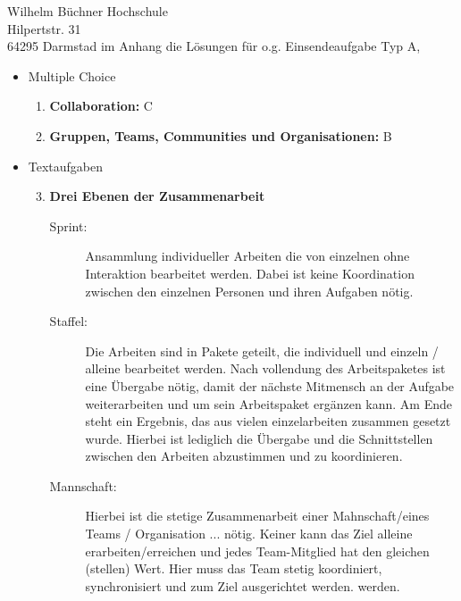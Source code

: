\documentclass[
    version=last,           %
    DIV=13,                 %
    BCOR=0mm,               %
    paper=a4,               %
    fontsize=12pt,          %
    firsthead=on,           %
    firstfoot=on,           %
    pagenumber=on,i         %
    parskip=half,           %
    enlargefirstpage=,      %
    firsthead=on,           %
    fromrule=afteraddress,  %
    priority=off,           %
    backaddress=true,       %
    refline=dateright,      %
	fromalign=right,	    %
    fromemail=on,i          %
    fromurl=on,             %
    frombank=on,
    fromphone=on,           %
    frommobilephone=on      %
    fromlogo=on,            %
    addrfield=on,           %
    subject=untitled,  %
    foldmarks=off,          %
    numericaldate=off,      %
	pagenumber=right,	        %
	parskip=half,	        %
    headsep=false,          %
    footsepline=true,       %
    foldmarks=off,		    %
	]{scrlttr2}
\begin{document}
\begin{letter} {Wilhelm Büchner Hochschule \\
Hilpertstr. 31\\
64295 Darmstad}
im Anhang die Lösungen für o.g. Einsendeaufgabe Typ A,
\\
\begin{itemize}
    \item Multiple Choice
        \begin{enumerate}
        \item \textbf{Collaboration:} C
        \item \textbf{Gruppen, Teams, Communities und Organisationen:} B
        \end{enumerate}
            \vspace{1cm}
    \item Textaufgaben
        \begin{enumerate}
        \setcounter{enumi}{2}
    \item \textbf{Drei Ebenen der Zusammenarbeit}
        \begin{description}
    \item[Sprint:]  Ansammlung individueller Arbeiten die von einzelnen ohne
        Interaktion bearbeitet werden. Dabei ist keine Koordination zwischen den
        einzelnen Personen und ihren Aufgaben nötig.
    \item[Staffel:] Die Arbeiten sind in Pakete geteilt, die individuell und
        einzeln / alleine bearbeitet werden. Nach vollendung des Arbeitspaketes
        ist eine Übergabe nötig, damit der nächste Mitmensch an der Aufgabe
        weiterarbeiten und um sein Arbeitspaket ergänzen kann. Am Ende steht ein
        Ergebnis, das aus vielen einzelarbeiten zusammen gesetzt wurde. Hierbei
        ist lediglich die Übergabe und die Schnittstellen zwischen den Arbeiten
        abzustimmen und zu koordinieren.
    \item[Mannschaft:] Hierbei ist die stetige Zusammenarbeit einer
        Mahnschaft/eines Teams / Organisation ... nötig. Keiner kann das Ziel
        alleine erarbeiten/erreichen und jedes Team-Mitglied hat den gleichen
        (stellen) Wert. Hier muss das Team stetig koordiniert, synchronisiert
        und zum Ziel ausgerichtet werden.
        werden.
        \end{description}


\end{enumerate}
\end{itemize}
\end{letter}
\end{document}
